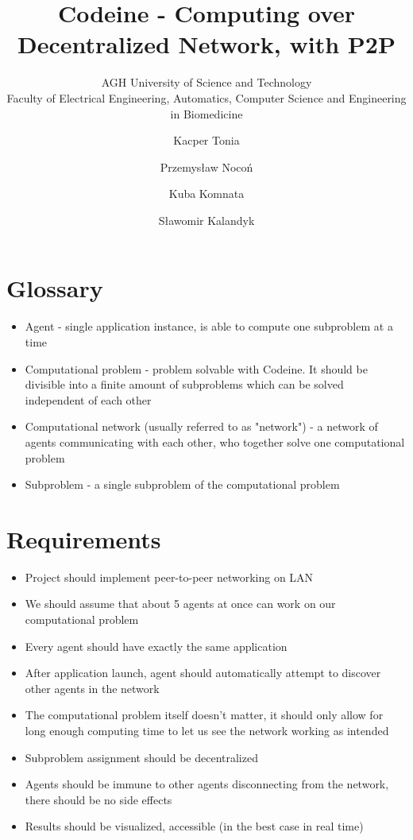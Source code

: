 \documentclass{article}
\title{Codeine - Computing over Decentralized Network, with P2P}
\subtitle{AGH University of Science and Technology\\
    Faculty of Electrical Engineering, Automatics, Computer Science and Engineering in Biomedicine}
\author{Kacper Tonia\and
        Przemysław Nocoń\and
        Kuba Komnata\and
        Sławomir Kalandyk}
\date{}
\begin{document}
\maketitle

\section{Glossary}
\begin{itemize}
    \item Agent - single application instance, is able to compute one subproblem at a time
    \item Computational problem - problem solvable with Codeine. It should be divisible into a finite amount of subproblems which can be solved independent of each other
    \item Computational network (usually referred to as "network") - a network of agents communicating with each other, who together solve one computational problem
    \item Subproblem - a single subproblem of the computational problem
\end{itemize}

\section{Requirements}
\begin{itemize}
    \item Project should implement peer-to-peer networking on LAN
    \item We should assume that about 5 agents at once can work on our computational problem
    \item Every agent should have exactly the same application
    \item After application launch, agent should automatically attempt to discover other agents in the network
    \item The computational problem itself doesn't matter, it should only allow for long enough computing time to let us see the network working as intended
    \item Subproblem assignment should be decentralized
    \item Agents should be immune to other agents disconnecting from the network, there should be no side effects
    \item Results should be visualized, accessible (in the best case in real time)
\end{itemize}
\end{document}
